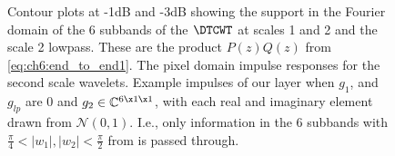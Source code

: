 \begin{figure}
  \centering
  \hspace{1cm}
  \newline
  \caption[Contour Plots]{ Contour plots at
    -1dB and -3dB showing the support in the Fourier domain of the 6 subbands of
    the $\DTCWT$ at scales 1 and 2 and the scale 2 lowpass. These are the 
    product $P(z)Q(z)$ from \autoref{eq:ch6:end_to_end1}.%
     The pixel domain impulse responses for
    the second scale wavelets.  Example
    impulses of our layer when $g_1$, and $g_{lp}$ are 0 and 
    $g_2 \in \mathbb{C}^{6\x 1\x 1}$, with each real and imaginary element 
    drawn from $\mathcal{N}(0,1)$. I.e., only information in the 6 subbands with 
    $\frac{\pi}{4} < |w_1|, |w_2| < \frac{\pi}{2}$ from 
     is passed through.} 
  \label{fig:ch6:dtcwt_bands}
\end{figure}

